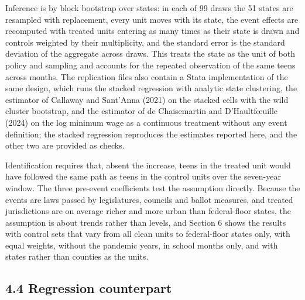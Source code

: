 \documentclass[12pt]{article}
\begin{document}
Inference is by block bootstrap over states: in each of 99 draws the 51 states are resampled with replacement, every unit moves with its state, the event effects are recomputed with treated units entering as many times as their state is drawn and controls weighted by their multiplicity, and the standard error is the standard deviation of the aggregate across draws. This treats the state as the unit of both policy and sampling and accounts for the repeated observation of the same teens across months. The replication files also contain a Stata implementation of the same design, which runs the stacked regression with analytic state clustering, the estimator of Callaway and Sant'Anna (2021) on the stacked cells with the wild cluster bootstrap, and the estimator of de Chaisemartin and D'Haultf{\oe}uille (2024) on the log minimum wage as a continuous treatment without any event definition; the stacked regression reproduces the estimates reported here, and the other two are provided as checks.

Identification requires that, absent the increase, teens in the treated unit would have followed the same path as teens in the control units over the seven-year window. The three pre-event coefficients test the assumption directly. Because the events are laws passed by legislatures, councils and ballot measures, and treated jurisdictions are on average richer and more urban than federal-floor states, the assumption is about trends rather than levels, and Section 6 shows the results with control sets that vary from all clean units to federal-floor states only, with equal weights, without the pandemic years, in school months only, and with states rather than counties as the units.

\subsection{4.4 Regression counterpart}
\end{document}
